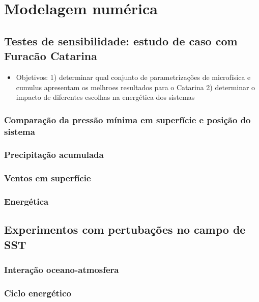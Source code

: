 \chapter{Modelagem numérica}

\section{Testes de sensibilidade: estudo de caso com Furacão Catarina}
\begin{itemize}
    \item Objetivos: 1) determinar qual conjunto de parametrizações de microfísica e cumulus apresentam os melhroes resultados para o Catarina 2) determinar o impacto de diferentes escolhas na energética dos sistemas
\end{itemize}
\subsection{Comparação da pressão mínima em superfície e posição do sistema}
\subsection{Precipitação acumulada}
\subsection{Ventos em superfície}
\subsection{Energética}

\section{Experimentos com pertubações no campo de SST }
\subsection{Interação oceano-atmosfera}
\subsection{Ciclo energético}